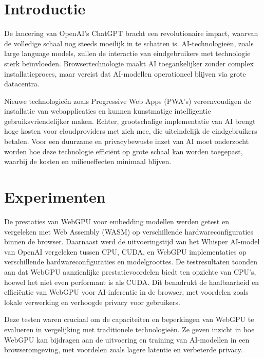 \documentclass[a0,portrait]{hogent-poster}
\begin{document}
\begin{multicols}{2} %

\section{Introductie}

De lancering van OpenAI's ChatGPT bracht een revolutionaire impact, waarvan de volledige schaal nog steeds moeilijk in te schatten is. AI-technologieën, zoals large language models, zullen de interactie van eindgebruikers met technologie sterk beïnvloeden. Browsertechnologie maakt AI toegankelijker zonder complex installatieproces, maar vereist dat AI-modellen operationeel blijven via grote datacentra.

Nieuwe technologieën zoals Progressive Web Apps (PWA's) vereenvoudigen de installatie van webapplicaties en kunnen kunstmatige intelligentie gebruiksvriendelijker maken. Echter, grootschalige implementatie van AI brengt hoge kosten voor cloudproviders met zich mee, die uiteindelijk de eindgebruikers betalen. Voor een duurzame en privacybewuste inzet van AI moet onderzocht worden hoe deze technologie efficiënt op grote schaal kan worden toegepast, waarbij de kosten en milieueffecten minimaal blijven.

\section{Experimenten}

De prestaties van WebGPU voor embedding modellen werden getest en vergeleken met Web Assembly (WASM) op verschillende hardwareconfiguraties binnen de browser. Daarnaast werd de uitvoeringstijd van het Whisper AI-model van OpenAI vergeleken tussen CPU, CUDA, en WebGPU implementaties op verschillende hardwareconfiguraties en modelgroottes. De testresultaten toonden aan dat WebGPU aanzienlijke prestatievoordelen biedt ten opzichte van CPU's, hoewel het niet even performant is als CUDA. Dit benadrukt de haalbaarheid en efficiëntie van WebGPU voor AI-inferentie in de browser, met voordelen zoals lokale verwerking en verhoogde privacy voor gebruikers.

Deze testen waren cruciaal om de capaciteiten en beperkingen van WebGPU te evalueren in vergelijking met traditionele technologieën. Ze geven inzicht in hoe WebGPU kan bijdragen aan de uitvoering en training van AI-modellen in een browseromgeving, met voordelen zoals lagere latentie en verbeterde privacy.


\end{multicols}
\end{document}
